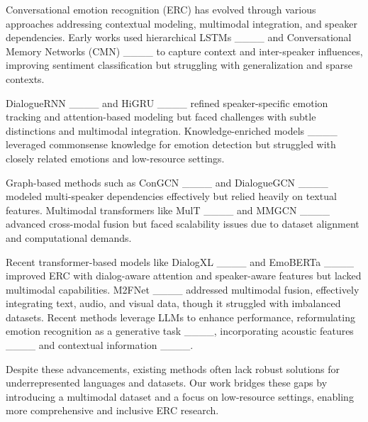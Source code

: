 Conversational emotion recognition (ERC) has evolved through various approaches addressing contextual modeling, multimodal integration, and speaker dependencies. Early works used hierarchical LSTMs ____ and Conversational Memory Networks (CMN) ____ to capture context and inter-speaker influences, improving sentiment classification but struggling with generalization and sparse contexts.

DialogueRNN ____ and HiGRU ____ refined speaker-specific emotion tracking and attention-based modeling but faced challenges with subtle distinctions and multimodal integration. Knowledge-enriched models ____ leveraged commonsense knowledge for emotion detection but struggled with closely related emotions and low-resource settings.

Graph-based methods such as ConGCN ____ and DialogueGCN ____ modeled multi-speaker dependencies effectively but relied heavily on textual features. Multimodal transformers like MulT ____ and MMGCN ____ advanced cross-modal fusion but faced scalability issues due to dataset alignment and computational demands.

Recent transformer-based models like DialogXL ____ and EmoBERTa ____ improved ERC with dialog-aware attention and speaker-aware features but lacked multimodal capabilities. M2FNet ____ addressed multimodal fusion, effectively integrating text, audio, and visual data, though it struggled with imbalanced datasets. Recent methods leverage LLMs to enhance performance, reformulating emotion recognition as a generative task ____, incorporating acoustic features ____ and contextual information ____.

Despite these advancements, existing methods often lack robust solutions for underrepresented languages and datasets. Our work bridges these gaps by introducing a multimodal dataset and a focus on low-resource settings, enabling more comprehensive and inclusive ERC research.